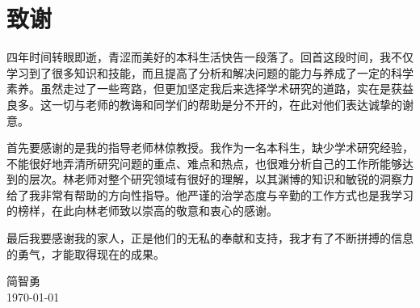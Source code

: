 
\chapter{致谢}

	四年时间转眼即逝，青涩而美好的本科生活快告一段落了。回首这段时间，我不仅学习到了很多知识和技能，而且提高了分析和解决问题的能力与养成了一定的科学素养。虽然走过了一些弯路，但更加坚定我后来选择学术研究的道路，实在是获益良多。这一切与老师的教诲和同学们的帮助是分不开的，在此对他们表达诚挚的谢意。

	首先要感谢的是我的指导老师林倞教授。我作为一名本科生，缺少学术研究经验，不能很好地弄清所研究问题的重点、难点和热点，也很难分析自己的工作所能够达到的层次。林老师对整个研究领域有很好的理解，以其渊博的知识和敏锐的洞察力给了我非常有帮助的方向性指导。他严谨的治学态度与辛勤的工作方式也是我学习的榜样，在此向林老师致以崇高的敬意和衷心的感谢。

	最后我要感谢我的家人，正是他们的无私的奉献和支持，我才有了不断拼搏的信息的勇气，才能取得现在的成果。

\vskip 108pt
\begin{flushright}
	简智勇\makebox[1cm]{} \\
\today
\end{flushright}

